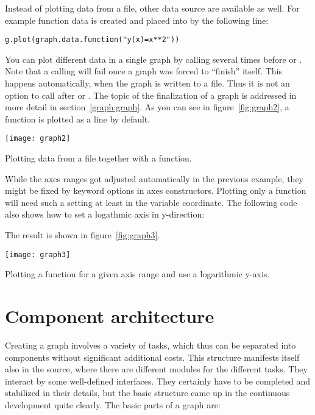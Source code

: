 Instead of plotting data from a file, other data source are available
as well. For example function data is created and placed into
 by the following line:
\begin{verbatim}
g.plot(graph.data.function("y(x)=x**2"))
\end{verbatim}
You can plot different data in a single graph by calling
 several times before  or
. Note that a calling  will fail
once a graph was forced to ``finish'' itself. This happens
automatically, when the graph is written to a file. Thus it is not an
option to call  after  or
. The topic of the finalization of a graph is
addressed in more detail in section~\ref{graph:graph}. As you can see
in figure~\ref{fig:graph2}, a function is plotted as a line by
default.

\texttt{[image: graph2]}
\centerline{Plotting data from a file together with a function.}

While the axes ranges got adjusted automatically in the previous
example, they might be fixed by keyword options in axes constructors.
Plotting only a function will need such a setting at least in the
variable coordinate. The following code also shows how to set a
logathmic axis in y-direction:



The result is shown in figure~\ref{fig:graph3}.

\texttt{[image: graph3]}
\centerline{Plotting a function for a given axis range and use a logarithmic y-axis.}

\section{Component architecture} %
\label{graph:components}

Creating a graph involves a variety of tasks, which thus can be
separated into components without significant additional costs.
This structure manifests itself also in the \PyX{} source, where there
are different modules for the different tasks. They interact by some
well-defined interfaces. They certainly have to be completed and
stabilized in their details, but the basic structure came up in the
continuous development quite clearly. The basic parts of a graph are:

